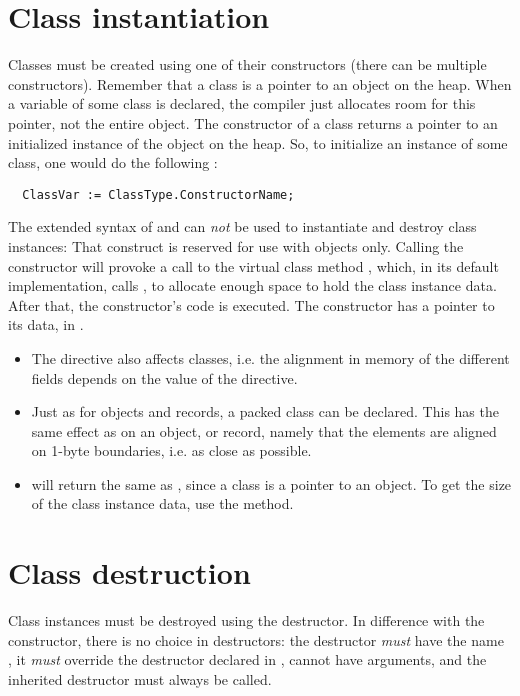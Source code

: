 \section{Class instantiation}
\label{se:classinstantiation}
Classes must be created using one of their constructors (there can be
multiple constructors). Remember that a class is a pointer to an object on
the heap. When a variable of some class is declared, the compiler just 
allocates room for this pointer, not the entire object. The constructor of
a class returns a pointer to an initialized instance of the object on the
heap. So, to initialize an instance of some class, one would do the following :
\begin{verbatim}
  ClassVar := ClassType.ConstructorName;
\end{verbatim}
The extended syntax of  and  can {\em not} be used to
instantiate and destroy class instances:
That construct is reserved for use with objects only.
Calling the constructor will provoke a call to the virtual class method
, which, in its default implementation, calls , to allocate
enough space to hold the class instance data.
After that, the constructor's code is executed.
The constructor has a pointer to its data, in .

\begin{remark}
\begin{itemize}
\item The  directive also affects classes,
i.e. the alignment in memory of the different fields depends on the
value of  the  directive.
\item Just as for objects and records, a packed class can be declared.
This has the same effect as on an object, or record, namely that the
elements are aligned on 1-byte boundaries, i.e. as close as possible.
\item {} will return the same as , 
since a class is a pointer to an object. To get the size of the class 
instance data, use the  method.
\end{itemize}
\end{remark}

\section{Class destruction}
Class instances must be destroyed using the destructor. In difference with
the constructor, there is no choice in destructors: the destructor {\em must} 
have the name , it {\em must}  override the  destructor 
declared in , cannot have arguments, and the inherited destructor 
must always be called.

